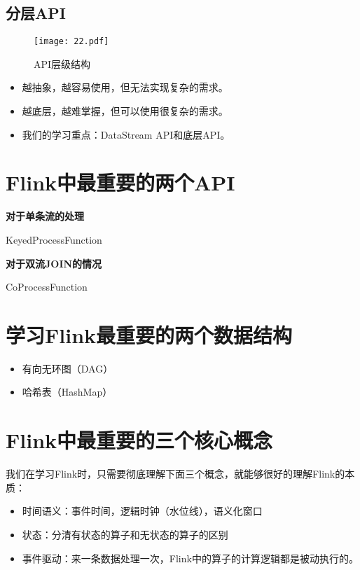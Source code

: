 \documentclass[cn,11pt,chinese]{elegantbook}
\begin{document}
\subsection{分层API}

\clearpage
\begin{figure}[htbp]
  \centering
  \texttt{[image: 22.pdf]}
  \caption{API层级结构}
\end{figure}

\begin{itemize}
  \item 越抽象，越容易使用，但无法实现复杂的需求。
  \item 越底层，越难掌握，但可以使用很复杂的需求。
  \item 我们的学习重点：DataStream API和底层API。
\end{itemize}

\section{Flink中最重要的两个API}

\textbf{对于单条流的处理}

\begin{tcolorbox}
KeyedProcessFunction
\end{tcolorbox}

\textbf{对于双流JOIN的情况}

\begin{tcolorbox}
CoProcessFunction
\end{tcolorbox}

\section{学习Flink最重要的两个数据结构}

\begin{itemize}
  \item 有向无环图（DAG）
  \item 哈希表（HashMap）
\end{itemize}

\section{Flink中最重要的三个核心概念}

我们在学习Flink时，只需要彻底理解下面三个概念，就能够很好的理解Flink的本质：

\begin{itemize}
  \item 时间语义：事件时间，逻辑时钟（水位线），语义化窗口
  \item 状态：分清有状态的算子和无状态的算子的区别
  \item 事件驱动：来一条数据处理一次，Flink中的算子的计算逻辑都是被动执行的。
\end{itemize}
\end{document}
